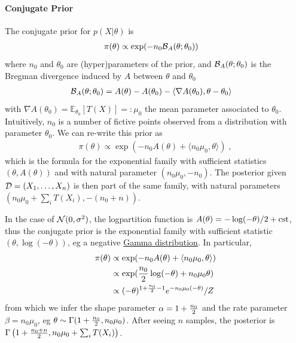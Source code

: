 \documentclass{article}
\newenvironment{example}{
	\begin{mdframed}[backgroundcolor=light-gray, roundcorner=5pt]
}{		
	\end{mdframed}
}
\newcommand*{\expect}[2][]{\ensuremath{\mathbb{E}_{#1} \left[ #2 \right] }} %
\newcommand{\logpart}{A}
\newcommand{\bregman}{\cB_\logpart}
\newcommand{\natp}{\theta}
\newcommand{\meanp}{\mu}
\begin{document}
\paragraph{Conjugate Prior}
The conjugate prior for $p(X|\natp)$ is
\begin{align}
    \pi(\natp) &\propto \exp( - n_0 \bregman(\natp ; \natp_0) )
\end{align}
where $n_0$ and $\natp_0$ are (hyper)parameters of the prior, and $\bregman(\natp ; \natp_0)$ is the Bregman divergence induced by $\logpart$ between $\natp$ and $\natp_0$
\begin{align}
    \bregman (\natp ; \natp_0)
    & = \logpart(\natp) - \logpart(\natp_0) 
    - \langle \nabla \logpart(\natp_0)  , \natp - \natp_0 \rangle
\end{align}
with $\nabla \logpart(\natp_0) = \expect[\natp_0]{T(X)} =: \meanp_0$ the mean parameter associated to $\natp_0$. 
Intuitively, $n_0$ is a number of fictive points observed from a distribution with parameter $\natp_0$.
We can re-write this prior as 
\begin{align}
    \pi(\natp) \propto 
    \exp( -n_0 \logpart (\natp) 
    + \langle n_0 \mu_0, \natp \rangle ) \; ,
\end{align}
which is the formula for the exponential family with sufficient statistics $(\natp ,\logpart(\natp))$ and with natural parameter $(n_0 \mu_0, -n_0)$.
The posterior given $\cD=(X_1,\dots, X_n)$ is then part of the same family, with natural parameters $(n_0 \mu_0 + \sum_i T(X_i) , -(n_0 + n))$.

\begin{example}
In the case of $\cN(0,\sigma^2)$, the logpartition function is $\logpart(\natp) = -\log(-\natp) /2 + \cst$, thus the conjugate prior is the exponential family with sufficient statistic $(\natp, \log(-\natp) )$, eg a negative \href{https://en.wikipedia.org/wiki/Gamma_distribution}{Gamma distribution}.
In particular,
\begin{align}
	\pi(\natp) 
	&\propto 
    \exp( -n_0 \logpart (\natp) 
    + \langle n_0 \mu_0, \natp \rangle ) \\
    &\propto \exp( \half[n_0] \log(-\natp) + n_0\mu_0 \natp ) \\
	&\propto (-\natp)^{1 + \half[n_0] -1 } e^{-n_0 \mu_0 (-\natp)} / Z
\end{align}
from which we infer the shape parameter $\alpha=1 + \half[n_0]$ and the rate parameter $\beta = n_0 \mu_0$, eg $\natp \sim \Gamma (1+\half[n_0] , n_0 \mu_0)$. After seeing $n$ samples, the posterior is $\Gamma\left(1+\half[n_0+n] , n_0 \mu_0 + \sum_i T(X_i) \right)$.
\end{example}
\end{document}
